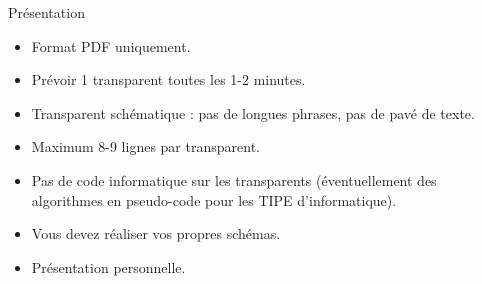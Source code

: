 \documentclass{beamer}
\begin{document}
\begin{frame}{Présentation}
    \begin{itemize}
        \item Format PDF uniquement. 
        \item Prévoir 1 transparent toutes les 1-2 minutes. 
        \item Transparent schématique : pas de longues phrases, pas de pavé de texte. 
        \item Maximum 8-9 lignes par transparent. 
        \item Pas de code informatique sur les transparents (éventuellement des algorithmes en pseudo-code pour les TIPE d'informatique). 
        \item Vous devez réaliser vos propres schémas. 
        \item Présentation personnelle. 
    \end{itemize}

\end{frame}
\end{document}

